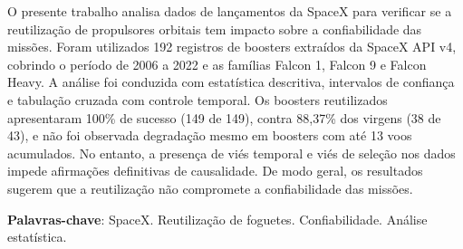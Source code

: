 \documentclass[
    12pt,
    openright,
    oneside,
    a4paper,
    brazil
]{abntex2}
\begin{document}
\pretextual

\imprimircapa

\imprimirfolhaderosto

\begin{resumo}
O presente trabalho analisa dados de lançamentos da SpaceX para verificar se a reutilização de propulsores orbitais tem impacto sobre a confiabilidade das missões. Foram utilizados 192 registros de boosters extraídos da SpaceX API v4, cobrindo o período de 2006 a 2022 e as famílias Falcon 1, Falcon 9 e Falcon Heavy. A análise foi conduzida com estatística descritiva, intervalos de confiança e tabulação cruzada com controle temporal. Os boosters reutilizados apresentaram 100\% de sucesso (149 de 149), contra 88,37\% dos virgens (38 de 43), e não foi observada degradação mesmo em boosters com até 13 voos acumulados. No entanto, a presença de viés temporal e viés de seleção nos dados impede afirmações definitivas de causalidade. De modo geral, os resultados sugerem que a reutilização não compromete a confiabilidade das missões.

\vspace{\onelineskip}
\noindent
\textbf{Palavras-chave}: SpaceX. Reutilização de foguetes. Confiabilidade. Análise estatística.
\end{resumo}

\tableofcontents*
\cleardoublepage

\textual







\postextual


\end{document}
